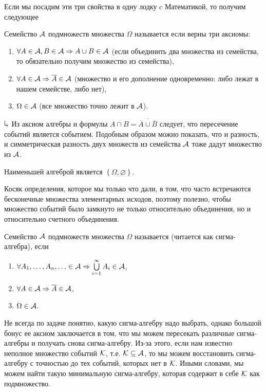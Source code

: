 \documentclass[../TV&MS.tex]{subfiles}
\begin{document}
Если мы посадим эти три свойства в одну лодку c Математикой, то получим следующее 
\begin{Def}
	Семейство $\mathcal{A}$ подмножеств множества $\Omega$  называется  если 
	верны три аксиомы:
\begin{enumerate}[label=(\roman*)]
	\item $\forall A \in \mathcal{A}, B\in \mathcal{A} \Rightarrow A \cup B \in \mathcal{A}$ (если объединить
	два множества из семейства, то обязательно получим множество из семейства),
	\item $\forall A \in \mathcal{A} \Rightarrow \overline{A} \in \mathcal{A}$ (множество и его дополнение
	одновременно: либо лежат в нашем семействе, либо нет),
	\item $\Omega \in \mathcal{A}$ (все множество точно лежит в $\mathcal{A}$).
\end{enumerate}\smallskip
\end{Def}

$\h$ Из аксиом алгебры и формулы $A\cap B = \overline{\overline{A} \cup \overline {B}}$ 
следует, что пересечение событий является событием. Подобным образом можно показать, 
что и разность, и симметрическая разность двух множеств из семейства $\mathcal{A}$ тоже
дадут множество из $\mathcal{A}$.

\begin{Ex}
	Наименьшей алгеброй является $\left\{ \Omega, \varnothing \right\}$.
\end{Ex}

Косяк определения, которое мы только что дали, в том, что часто встречаются бесконечные множества элементарных исходов, поэтому полезно, чтобы множество
событий было замкнуто не только относительно объединения, но и 
относительно счетного объединения.

\begin{Def}
	Семейство $\mathcal{A}$ подмножеств множества $\Omega$ называется 
	(читается как сигма-алгебра), если 
\begin{enumerate}[label=(\roman*)]
	\item $\forall A_1,\dots,A_n,\ldots\in\mathcal{A}\Rightarrow\bigcup\limits_{i=1}^{\infty}A_i\in\mathcal{A}$,
	\item $\forall A \in \mathcal{A} \Rightarrow \overline{A} \in \mathcal{A}$,
	\item $\Omega \in \mathcal{A}$.
\end{enumerate}\smallskip
\end{Def}

Не всегда по задаче понятно, какую сигма-алгебру надо выбрать, однако большой
бонус ее аксиом заключается в том, что мы можем пересекать различные сигма-алгебры
и получать снова сигма-алгебру. Из-за этого, если нам известно неполное множество
событий $\mathcal{K}$, т.е. $\mathcal{K}\subseteq\mathcal{A}$, то мы можем восстановить сигма-алгебру
с точностью до тех событий, которых нет в $\mathcal{K}$. Иными словами, мы можем
найти такую минимальную сигма-алгебру, которая содержит в себе $\mathcal{K}$ как подмножество.
\end{document}
